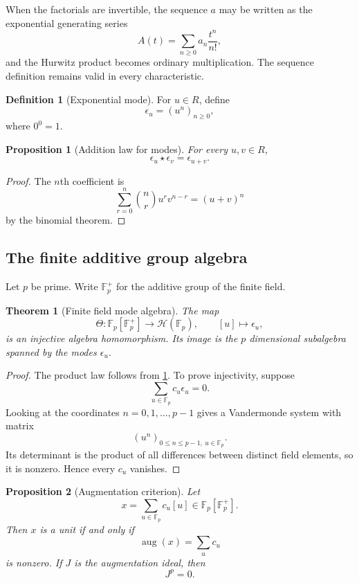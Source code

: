 \documentclass{aomart}
\newtheorem{theorem}{Theorem}[section]
\newtheorem{proposition}[proposition]{Proposition}
\theoremstyle{definition}
\newtheorem{definition}[definition]{Definition}
\theoremstyle{remark}
\newcommand{\FF}{\mathbb F}
\newcommand{\Hcal}{\mathcal H}
\newcommand{\starh}{\mathbin{\star}}
\begin{document}
When the factorials are invertible, the sequence \(a\) may be written as the exponential generating series
\[
A(t)=\sum_{n\geq0}a_n\frac{t^n}{n!},
\]
and the Hurwitz product becomes ordinary multiplication. The sequence definition remains valid in every characteristic.

\begin{definition}[Exponential mode]\label{def:exponential_mode}
For \(u\in R\), define
\[
\epsilon_u=(u^n)_{n\geq0},
\]
where \(0^0=1\).
\end{definition}

\begin{proposition}[Addition law for modes]\label{prop:mode_addition}
For every \(u,v\in R\),
\[
\boxed{
\epsilon_u\starh\epsilon_v
=
\epsilon_{u+v}.
}
\]
\end{proposition}

\begin{proof}
The \(n\)th coefficient is
\[
\sum_{r=0}^{n}
\binom nr u^rv^{n-r}
=
(u+v)^n
\]
by the binomial theorem.
\end{proof}

\subsection{The finite additive group algebra}

Let \(p\) be prime. Write \(\FF_p^+\) for the additive group of the finite field.

\begin{theorem}[Finite field mode algebra]\label{thm:mode_group_algebra}
The map
\[
\Theta:
\FF_p[\FF_p^+]
\longrightarrow
\Hcal(\FF_p),
\qquad
[u]\longmapsto\epsilon_u,
\]
is an injective algebra homomorphism. Its image is the \(p\) dimensional subalgebra spanned by the modes \(\epsilon_u\).
\end{theorem}

\begin{proof}
The product law follows from \cref{prop:mode_addition}. To prove injectivity, suppose
\[
\sum_{u\in\FF_p}c_u\epsilon_u=0.
\]
Looking at the coordinates \(n=0,1,\ldots,p-1\) gives a Vandermonde system with matrix
\[
(u^n)_{0\leq n\leq p-1,\ u\in\FF_p}.
\]
Its determinant is the product of all differences between distinct field elements, so it is nonzero. Hence every \(c_u\) vanishes.
\end{proof}

\begin{proposition}[Augmentation criterion]\label{prop:augmentation_criterion}
Let
\[
x=\sum_{u\in\FF_p}c_u[u]
\in
\FF_p[\FF_p^+].
\]
Then \(x\) is a unit if and only if
\[
\operatorname{aug}(x)
=
\sum_uc_u
\]
is nonzero. If \(J\) is the augmentation ideal, then
\[
J^p=0.
\]
\end{proposition}
\end{document}
